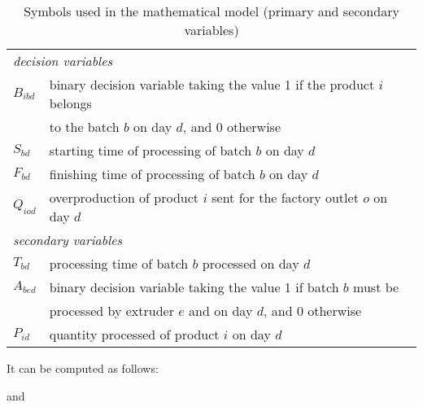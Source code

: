 \begin{table}[h!]
\begin{center}
\footnotesize
	\begin{tabular}{ l l } 

		\multicolumn{2}{l}{\emph{decision variables}} \\ 
		
		$B_{ibd}$ & binary decision variable taking the value 1 if the product $i$ belongs \\
		& to the batch $b$ on day $d$, and 0 otherwise \\
       	$S_{bd}$ & starting time of processing of batch $b$ on day $d$ \\
       	$F_{bd}$ & finishing time of processing of batch $b$ on day $d$ \\
       	$Q_{iod}$ & overproduction of product $i$ sent for the factory outlet $o$ on day $d$ \\
       	
       	\multicolumn{2}{l}{\emph{secondary variables}} \\ 
       	
		$T_{bd}$ & processing time of batch $b$ processed on day $d$ \\
		$A_{bed}$ &  binary decision variable taking the value 1 if batch $b$ must be \\
		&            processed by extruder $e$ and on day $d$, and 0 otherwise \\
		$P_{id}$ & quantity processed of product $i$ on day $d$
	\end{tabular}
\caption{Symbols used in the mathematical model (primary and secondary variables)}
\label{tab:symbols}
\end{center}
\end{table}

It can be computed
as follows:

and \cite{RefJ}
